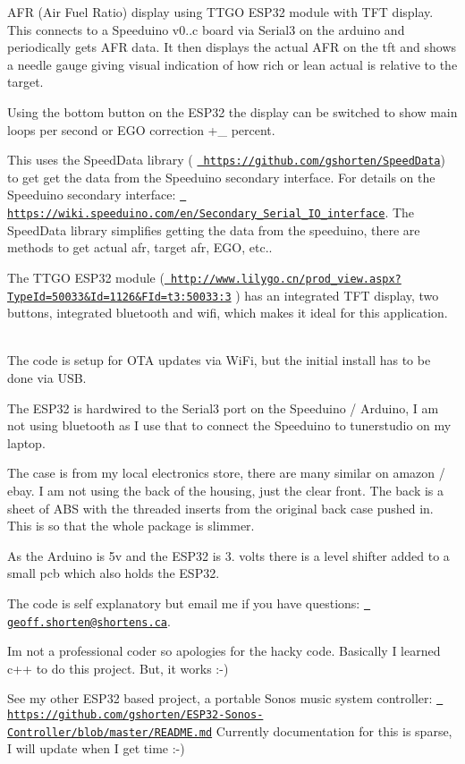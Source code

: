 AFR (Air Fuel Ratio) display using TTGO ESP32 module with TFT display. This connects to a Speeduino v0..\+c board via Serial3 on the arduino and periodically gets AFR data. It then displays the actual AFR on the tft and shows a needle gauge giving visual indication of how rich or lean actual is relative to the target.

Using the bottom button on the ESP32 the display can be switched to show main loops per second or EGO correction +\+\_\+ percent.

This uses the Speed\+Data library ( \href{https://github.com/gshorten/SpeedData}{\texttt{ https\+://github.\+com/gshorten/\+Speed\+Data}}) to get get the data from the Speeduino secondary interface. For details on the Speeduino secondary interface\+: \href{https://wiki.speeduino.com/en/Secondary_Serial_IO_interface}{\texttt{ https\+://wiki.\+speeduino.\+com/en/\+Secondary\+\_\+\+Serial\+\_\+\+IO\+\_\+interface}}. The Speed\+Data library simplifies getting the data from the speeduino, there are methods to get actual afr, target afr, EGO, etc..

The TTGO ESP32 module (\href{http://www.lilygo.cn/prod_view.aspx?TypeId=50033&Id=1126&FId=t3:50033:3}{\texttt{ http\+://www.\+lilygo.\+cn/prod\+\_\+view.\+aspx?\+Type\+Id=50033\&\+Id=1126\&\+FId=t3\+:50033\+:3}} ) has an integrated TFT display, two buttons, integrated bluetooth and wifi, which makes it ideal for this application. ~\newline


The code is setup for OTA updates via Wi\+Fi, but the initial install has to be done via USB.

The ESP32 is hardwired to the Serial3 port on the Speeduino / Arduino, I am not using bluetooth as I use that to connect the Speeduino to tunerstudio on my laptop.

The case is from my local electronics store, there are many similar on amazon / ebay. I am not using the back of the housing, just the clear front. The back is a sheet of ABS with the threaded inserts from the original back case pushed in. This is so that the whole package is slimmer.

As the Arduino is 5v and the ESP32 is 3. volts there is a level shifter added to a small pcb which also holds the ESP32.

The code is self explanatory but email me if you have questions\+: \href{mailto:geoff.shorten@shortens.ca}{\texttt{ geoff.\+shorten@shortens.\+ca}}.

I\textquotesingle{}m not a professional coder so apologies for the hacky code. Basically I learned c++ to do this project. But, it works \+:-\/)

See my other ESP32 based project, a portable Sonos music system controller\+: \href{https://github.com/gshorten/ESP32-Sonos-Controller/blob/master/README.md}{\texttt{ https\+://github.\+com/gshorten/\+ESP32-\/\+Sonos-\/\+Controller/blob/master/\+README.\+md}} Currently documentation for this is sparse, I will update when I get time \+:-\/) 